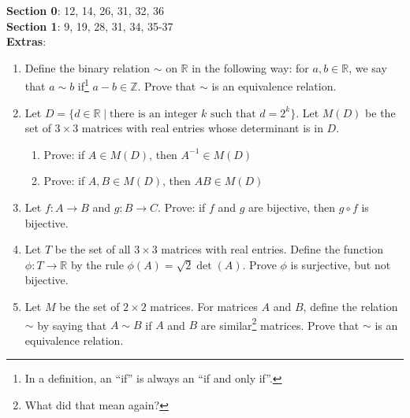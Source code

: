 \documentclass[12pt]{article}
\begin{document}
\textbf{Section 0}: 12, 14, 26, 31, 32, 36\\
\textbf{Section 1}: 9, 19, 28, 31, 34, 35-37\\
\textbf{Extras}:
\begin{enumerate}

\item Define the binary relation $\sim$ on $\mathbb{R}$ in the following way: for $a,b \in \mathbb{R}$, we say that $a \sim b$ if\footnote{In a definition, an ``if'' is always an ``if and only if''.} $a-b \in \mathbb{Z}$. Prove that $\sim$ is an equivalence relation.

\item Let $D=\{d \in \mathbb{R} \mid \text{there is an integer } k \text{ such that } d=2^k\}$. Let $M(D)$ be the set of $3 \times 3$ matrices with real entries whose determinant is in $D$.
\begin{enumerate}
\item Prove: if $A \in M(D)$, then $A^{-1} \in M(D)$
\item Prove: if $A, B \in M(D)$, then $AB \in M(D)$
\end{enumerate}

\item Let $f : A \to B$ and $g : B \to C$. Prove: if $f$ and $g$ are bijective, then $g \circ f$ is bijective.

\item Let $T$ be the set of all $3 \times 3$ matrices with real entries. Define the function $\phi : T \to \mathbb{R}$ by the rule $\phi(A) = \sqrt{2} \det(A)$. Prove $\phi$ is surjective, but not bijective.

\item Let $M$ be the set of $2 \times 2$ matrices. For matrices $A$ and $B$, define the relation $\sim$ by saying that $A \sim B$ if $A$ and $B$ are similar\footnote{What did that mean again?} matrices. Prove that $\sim$ is an equivalence relation.

\end{enumerate}

\clearpage
\end{document}
